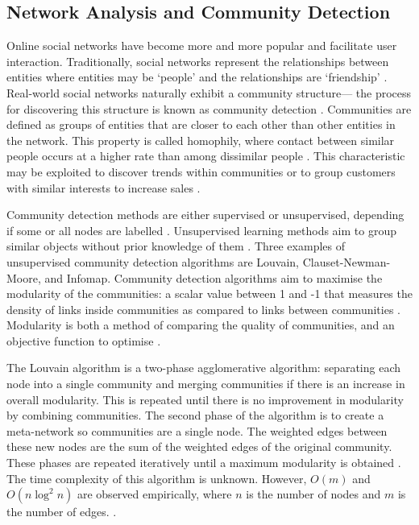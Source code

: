\subsection{Network Analysis and Community Detection}

Online social networks have become more and more popular and facilitate user interaction. Traditionally, social networks represent the relationships between entities where entities may be `people' and the relationships are `friendship' \cite{ozturk_2014}. Real-world social networks naturally exhibit a community structure— the process for discovering this structure is known as community detection \cite{Bedi_Sharma_2016}. Communities are defined as groups of entities that are closer to each other than other entities in the network. This property is called homophily, where contact between similar people occurs at a higher rate than among dissimilar people \cite{mcpherson_lovin_cook_2001}. This characteristic may be exploited to discover trends within communities or to group customers with similar interests to increase sales \cite{Tang2010CommunityDA}.


Community detection methods are either supervised or unsupervised, depending if some or all nodes are labelled \cite{chen2020supervised}. Unsupervised learning methods aim to group similar objects without prior knowledge of them \cite{Bedi_Sharma_2016}. Three examples of unsupervised community detection algorithms are Louvain, Clauset-Newman-Moore, and Infomap. Community detection algorithms aim to maximise the modularity of the communities: a scalar value between 1 and -1 that measures the density of links inside communities as compared to links between communities \cite{modularity}. Modularity is both a method of comparing the quality of communities, and an objective function to optimise \cite{louvain}.


The Louvain algorithm is a two-phase agglomerative algorithm: separating each node into a single community and merging communities if there is an increase in overall modularity. This is repeated until there is no improvement in modularity by combining communities. The second phase of the algorithm is to create a meta-network so communities are a single node. The weighted edges between these new nodes are the sum of the weighted edges of the original community. These phases are repeated iteratively until a maximum modularity is obtained \cite{louvain}. The time complexity of this algorithm is unknown. However, $O(m)$ and $O(n \log^2 n)$ are observed empirically, where $n$ is the number of nodes and $m$ is the number of edges. \cite{Bedi_Sharma_2016, lancichinetti_fortunato_2009}.


